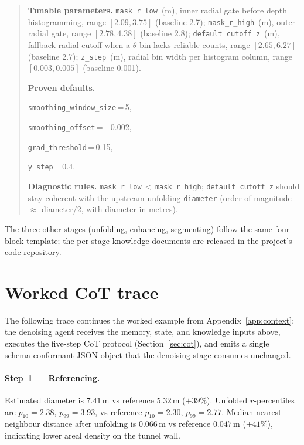\documentclass[a4paper,fleqn]{cas-dc}
\begin{document}
{\begin{quote}
\textbf{Tunable parameters.}
\texttt{mask\_r\_low}~(m), inner radial gate before depth histogramming, range $[2.09, 3.75]$ (baseline 2.7);
\texttt{mask\_r\_high}~(m), outer radial gate, range $[2.78, 4.38]$ (baseline 2.8);
\texttt{default\_cutoff\_z}~(m), fallback radial cutoff when a $\theta$-bin lacks reliable counts, range $[2.65, 6.27]$ (baseline 2.7);
\texttt{z\_step}~(m), radial bin width per histogram column, range $[0.003, 0.005]$ (baseline 0.001).

\textbf{Proven defaults.}\par
\texttt{smoothing\_window\_size}\,=\,5,\par
\texttt{smoothing\_offset}\,=\,$-0.002$,\par
\texttt{grad\_threshold}\,=\,0.15,\par
\texttt{y\_step}\,=\,0.4.

\textbf{Diagnostic rules.}
\texttt{mask\_r\_low}\,$<$\,\texttt{mask\_r\_high};
\texttt{default\_cutoff\_z} should stay coherent with the upstream unfolding \texttt{diameter} (order of magnitude $\approx$ diameter/2, with diameter in metres).
\end{quote}

The three other stages (unfolding, enhancing, segmenting) follow the same four-block template; the per-stage knowledge documents are released in the project's code repository.

\section{Worked CoT trace}\label{app:cot}

The following trace continues the worked example from Appendix~\ref{app:context}: the denoising agent receives the memory, state, and knowledge inputs above, executes the five-step CoT protocol (Section~\ref{sec:cot}), and emits a single schema-conformant JSON object that the denoising stage consumes unchanged.

\paragraph{Step~1 --- Referencing.}
Estimated diameter is $7.41$\,m vs reference $5.32$\,m ($+39\%$). Unfolded $r$-percentiles are $p_{10}=2.38$, $p_{99}=3.93$, vs reference $p_{10}=2.30$, $p_{99}=2.77$. Median nearest-neighbour distance after unfolding is $0.066$\,m vs reference $0.047$\,m ($+41\%$), indicating lower areal density on the tunnel wall.

}
\end{document}
